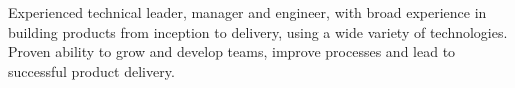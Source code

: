 

\begin{cvparagraph}

Experienced technical leader, manager and engineer, with broad experience in building products from inception to delivery, using a wide variety of technologies. Proven ability to grow and develop teams, improve processes and lead to successful product delivery.
\end{cvparagraph}
